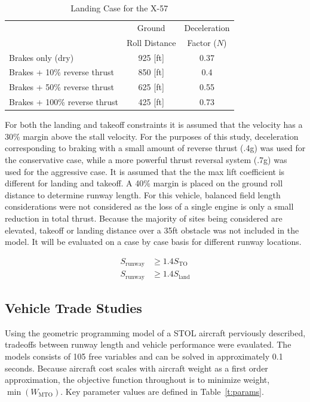 \documentclass[]{aiaa-tc}%
\begin{document}
\begin{table}[H]
    \centering
    \caption{Landing Case for the X-57}
    \label{t:landingdecel}
    \begin{tabular}{lcc}
    \toprule
    \toprule
                                    & Ground          & Deceleration \\ 
                                    & Roll Distance   & Factor ($N$)\\ \hline
    Brakes only (dry)               &  925 [ft]       & 0.37  \\
    Brakes + 10\% reverse thrust    &  850 [ft]       & 0.4   \\
    Brakes + 50\% reverse thrust    &  625 [ft]       & 0.55  \\
    Brakes + 100\% reverse thrust   &  425 [ft]       & 0.73  \\
    \bottomrule
\end{tabular}
\end{table}

For both the landing and takeoff constraints it is assumed that the velocity has a 30\% margin above the stall velocity\cite{ASTM3179}.
For the purposes of this study, deceleration corresponding to braking with a small amount of reverse thrust (.4g) was used for the conservative case, while a more powerful thrust reversal system (.7g) was used for the aggressive case. 
It is assumed that the the max lift coefficient is different for landing and takeoff.
A 40\% margin is placed on the ground roll distance to determine runway length\cite{PilotGuide}.  For this vehicle, balanced field length considerations were not considered as the loss of a single engine is only a small reduction in total thrust.  Because the majority of sites being considered are elevated, takeoff or landing distance over a 35ft obstacle was not included in the model.  It will be evaluated on a case by case basis for different runway locations.

\begin{align}
    S_{\mathrm{runway}} &\geq 1.4S_{\mathrm{TO}} \\
    S_{\mathrm{runway}} &\geq 1.4S_{\mathrm{land}} 
\end{align}

\subsection{Vehicle Trade Studies}

Using the geometric programming model of a STOL aircraft perviously described, tradeoffs between runway length and vehicle performance were evaulated.  The models consists of 105 free variables and can be solved in approximately 0.1 seconds. 
Because aircraft cost scales with aircraft weight as a first order approximation, the objective function throughout is to minimize weight, $\min{(W_{\mathrm{MTO}})}$. 
Key parameter values are defined in Table~\ref{t:params}.
\end{document}
